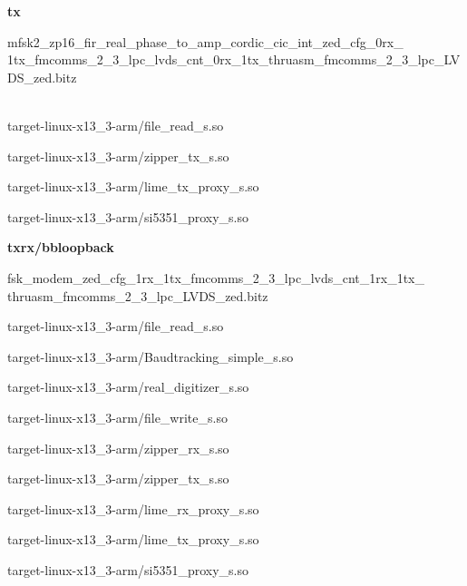 	\noindent\textbf{tx}
	\begin{itemize}
  \item mfsk2\_zp16\_fir\_real\_phase\_to\_amp\_cordic\_cic\_int\_zed\_cfg\_0rx\_\\
1tx\_fmcomms\_2\_3\_lpc\_lvds\_cnt\_0rx\_1tx\_thruasm\_fmcomms\_2\_3\_lpc\_LVDS\_zed.bitz
\\ \\
	\begin{minipage}[t]{.5\textwidth}
	\item target-linux-x13\_3-arm/file\_read\_s.so
	\item target-linux-x13\_3-arm/zipper\_tx\_s.so
	\end{minipage}
	\begin{minipage}[t]{.5\textwidth}
	\item target-linux-x13\_3-arm/lime\_tx\_proxy\_s.so
	\item target-linux-x13\_3-arm/si5351\_proxy\_s.so
	\end{minipage}
	\end{itemize}

	\noindent\textbf{txrx/bbloopback}
	\begin{itemize}
  \item fsk\_modem\_zed\_cfg\_1rx\_1tx\_fmcomms\_2\_3\_lpc\_lvds\_cnt\_1rx\_1tx\_\\
thruasm\_fmcomms\_2\_3\_lpc\_LVDS\_zed.bitz \\
	\begin{minipage}[t]{.5\textwidth}
	\item target-linux-x13\_3-arm/file\_read\_s.so
	\item target-linux-x13\_3-arm/Baudtracking\_simple\_s.so
	\item target-linux-x13\_3-arm/real\_digitizer\_s.so
	\item target-linux-x13\_3-arm/file\_write\_s.so
	\end{minipage}
	\begin{minipage}[t]{.5\textwidth}
	\item target-linux-x13\_3-arm/zipper\_rx\_s.so
	\item target-linux-x13\_3-arm/zipper\_tx\_s.so
	\item target-linux-x13\_3-arm/lime\_rx\_proxy\_s.so
	\item target-linux-x13\_3-arm/lime\_tx\_proxy\_s.so
	\item target-linux-x13\_3-arm/si5351\_proxy\_s.so
	\end{minipage}
	\end{itemize}




